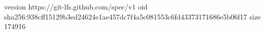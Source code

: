 version https://git-lfs.github.com/spec/v1
oid sha256:938cff15129b3ed24624e1ae457dc7f4a5c081553c6fd43373171686e5b06f17
size 174916

